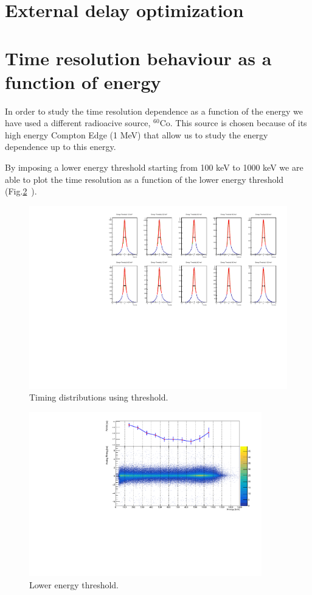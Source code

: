 \documentclass[a4paper,11pt]{article}
\begin{document}
\section*{External delay optimization}

\section*{Time resolution behaviour as a function of energy}
In order to study the time resolution dependence as a function of the energy we have used a different radioacive source, $^{60}$Co. This source is chosen because of its high energy Compton Edge (1 MeV) that allow us to study the energy dependence up to this energy. 

\smallskip

\noindent By imposing a lower energy threshold starting from 100 keV to 1000 keV we are able to plot the time resolution as a function of the lower energy threshold (Fig.\ref{Fig: lower energy thr}~).

\smallskip

\begin{figure}[h!]
\centering
\includegraphics[width = \textwidth]{ThresholdTAC_dists}
\caption{Timing distributions using threshold.}
\label{Fig: lower energy thr}
\end{figure}

\begin{figure}[h!]
\centering
\includegraphics[width = 0.9\textwidth]{ThresholdTAC_FWHMvs2Ddist}
\caption{Lower energy threshold.}
\label{Fig: lower energy thr}
\end{figure}
\end{document}
